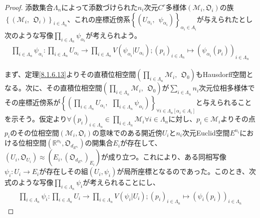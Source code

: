 \documentclass[dvipdfmx]{jsarticle}
\begin{document}
\begin{proof}
添数集合$\varLambda_{n}$によって添数づけられた$n_{i}$次元$C^{r}$多様体$\left( \mathcal{M}_{i},\mathfrak{O}_{i} \right)$の族$\left\{ \left( \mathcal{M}_{i},\ \ \mathfrak{O}_{i} \right) \right\}_{i \in \varLambda_{n}}$、これの座標近傍系$\left\{ \left( U_{\alpha_{i}},\ \ \psi_{\alpha_{i}} \right) \right\}_{\alpha_{i} \in A_{i}}$が与えられたとし次のような写像$\prod_{i \in \varLambda_{n}} \psi_{\alpha_{i}}$が考えられよう。
\begin{align*}
\prod_{i \in \varLambda_{n}} \psi_{\alpha_{i}}:\prod_{i \in \varLambda_{n}} U_{\alpha_{i}} \rightarrow \prod_{i \in \varLambda_{n}} {V\left( \psi_{\alpha_{i}}|U_{\alpha_{i}} \right)};\left( p_{i} \right)_{i \in \varLambda_{n}} \mapsto \left( \psi_{\alpha_{i}}\left( p_{i} \right) \right)_{i \in \varLambda_{n}}
\end{align*}\par
まず、定理\ref{8.1.6.13}よりその直積位相空間$\left( \prod_{i \in \varLambda_{n}} \mathcal{M}_{i},\ \ \mathfrak{O}_{0} \right)$もHausdorff空間となる。次に、その直積位相空間$\left( \prod_{i \in \varLambda_{n}} \mathcal{M}_{i},\ \ \mathfrak{O}_{0} \right)$が$\sum_{i \in \varLambda_{n}} n_{i}$次元位相多様体でその座標近傍系が$\left\{ \left( \prod_{i \in \varLambda_{n}} U_{\alpha_{i}},\ \ \prod_{i \in \varLambda_{n}} \psi_{\alpha_{i}} \right) \right\}_{\forall i \in \varLambda_{n}\left[ \alpha_{i} \in A_{i} \right]}$と与えられることを示そう。仮定より$\forall\left( p_{i} \right)_{i \in \varLambda_{n}} \in \prod_{i \in \varLambda_{n}} \mathcal{M}_{i}\forall i \in \varLambda_{n}$に対し、$p_{i} \in \mathcal{M}_{i}$よりその点$p_{i}$のその位相空間$\left( \mathcal{M}_{i},\mathfrak{O}_{i} \right)$の意味でのある開近傍$U_{i}$と$n_{i}$次元Euclid空間$E^{n_{i}}$における位相空間$\left( \mathbb{R}^{n_{i}},\mathfrak{O}_{d_{E^{n_{i}}}} \right)$の開集合$E_{i}$が存在して、$\left( U_{i},\mathfrak{O}_{U_{i}} \right) \approx \left( E_{i},\left( \mathfrak{O}_{d_{E^{n_{i}}}} \right)_{E_{i}} \right)$が成り立つ。これにより、ある同相写像$\psi_{i}:U_{i} \rightarrow E_{i}$が存在しその組$\left( U_{i},\psi_{i} \right)$が局所座標となるのであった。このとき、次式のような写像$\prod_{i \in \varLambda_{n}} \psi_{i}$が考えられることにし、
\begin{align*}
\prod_{i \in \varLambda_{n}} \psi_{i}:\prod_{i \in \varLambda_{n}} U_{i} \rightarrow \prod_{i \in \varLambda_{n}} {V\left( \psi_{i}|U_{i} \right)};\left( p_{i} \right)_{i \in \varLambda_{n}} \mapsto \left( \psi_{i}\left( p_{i} \right) \right)_{i \in \varLambda_{n}}
\end{align*}

\end{proof}
\end{document}
